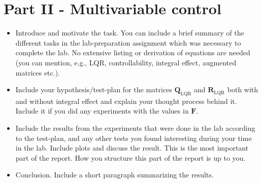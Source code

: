 \section{Part II - Multivariable control}
\begin{itemize}
    \item Introduce and motivate the task. You can include a brief summary of the different tasks in the lab-preparation assignment which was necessary to complete the lab. No extensive listing or derivation of equations are needed (you can mention, e.g., LQR, controllability, integral effect, augmented matrices etc.). 
    \item Include your hypothesis/test-plan for the matrices $\mathbf{Q}_{\text{LQR}}$ and $\mathbf{R}_{\text{LQR}}$ both with and without integral effect and explain your thought process behind it. Include it if you did any experiments with the values in $\mathbf{F}$.
    \item Include the results from the experiments that were done in the lab according to the test-plan, and any other tests you found interesting during your time in the lab. Include plots and discuss the result. This is the most important part of the report. How you structure this part of the report is up to you. 
    \item Conclusion. Include a short paragraph summarizing the results.
\end{itemize}